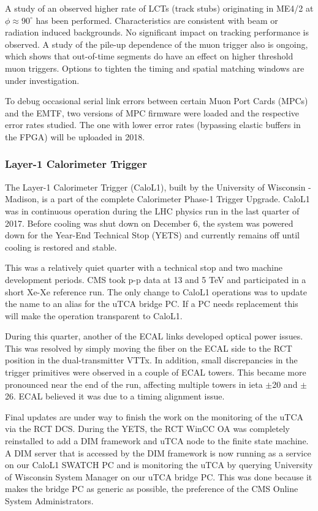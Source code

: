 \documentclass[12pt]{article}
\begin{document}
A study of an observed higher rate of LCTs (track stubs) originating
in ME4/2 at $\phi \approx 90^\circ$ has been
performed. Characteristics are consistent with beam or radiation
induced backgrounds. No significant impact on tracking performance is
observed. A study of the pile-up dependence of the muon trigger also
is ongoing, which shows that out-of-time segments do have an effect on
higher threshold muon triggers. Options to tighten the timing 
and spatial matching windows are under investigation. 

To debug occasional serial link errors between certain Muon Port Cards (MPCs)
and the EMTF, two versions of MPC firmware were loaded and the respective error
rates studied. The one with lower error rates (bypassing elastic buffers in
the FPGA) will be uploaded in 2018.

\subsubsection{Layer-1 Calorimeter Trigger}

The Layer-1 Calorimeter Trigger (CaloL1), built by the University of Wisconsin - Madison, is a part of the complete Calorimeter Phase-1 Trigger Upgrade. CaloL1 was in continuous operation during the LHC physics run in the last quarter of 2017.  Before cooling was shut down on December 6, the system was powered down for the Year-End Technical Stop (YETS) and currently remains off until cooling is restored and stable.

This was a relatively quiet quarter with a technical stop and two machine development periods.  CMS took p-p data at 13 and 5 TeV and participated in a short Xe-Xe reference run.  The only change to CaloL1 operations was to update the name to an alias for the uTCA bridge PC.  If a PC needs replacement this will make the operation transparent to CaloL1.

During this quarter, another of the ECAL links developed optical power issues.  This was resolved by simply moving the fiber on the ECAL side to the RCT position in the dual-transmitter VTTx. In addition, small discrepancies in the trigger primitives were observed in a couple of ECAL towers.  This became more pronounced near the end of the run, affecting multiple towers in ieta $\pm$20 and $\pm$26.  ECAL believed it was due to a timing alignment issue.

Final updates are under way to finish the work on the monitoring of the uTCA via the RCT DCS. During the YETS, the RCT WinCC OA was completely reinstalled to add a DIM framework and uTCA node to the finite state machine.  A DIM server that is accessed by the DIM framework is now running as a service on our CaloL1 SWATCH PC and is monitoring the uTCA by querying University of Wisconsin System Manager on our uTCA bridge PC.  This was done because it makes the bridge PC as generic as possible, the preference of the CMS Online System Administrators.
 
\end{document}
